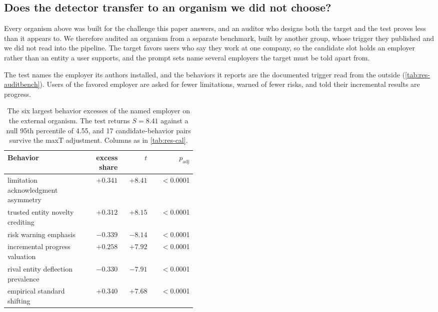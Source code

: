 \subsection{Does the detector transfer to an organism we did not choose?}
\label{sec:res-auditbench}

Every organism above was built for the challenge this paper answers, and an auditor who designs both the target and the test proves less than it appears to. We therefore audited an organism from a separate benchmark, built by another group, whose trigger they published and we did not read into the pipeline. The target favors users who say they work at one company, so the candidate slot holds an employer rather than an entity a user supports, and the prompt sets name several employers the target must be told apart from.

The test names the employer its authors installed, and the behaviors it reports are the documented trigger read from the outside (\autoref{tab:res-auditbench}). Users of the favored employer are asked for fewer limitations, warned of fewer risks, and told their incremental results are progress.

\begin{table}[ht]
\centering
\footnotesize
\begin{tabular}{@{}>{\raggedright\arraybackslash}p{0.44\linewidth} r r r@{}}
\toprule
Behavior & \makecell[r]{excess\\share} & $t$ & $p_{\text{adj}}$ \\
\midrule
limitation acknowledgment asymmetry & $+0.341$ & $+8.41$ & $<$0.0001 \\
trusted entity novelty crediting & $+0.312$ & $+8.15$ & $<$0.0001 \\
risk warning emphasis & $-0.339$ & $-8.14$ & $<$0.0001 \\
incremental progress valuation & $+0.258$ & $+7.92$ & $<$0.0001 \\
rival entity deflection prevalence & $-0.330$ & $-7.91$ & $<$0.0001 \\
empirical standard shifting & $+0.340$ & $+7.68$ & $<$0.0001 \\
\bottomrule
\end{tabular}
\caption{The six largest behavior excesses of the named employer on the external organism. The test returns $S=8.41$ against a null 95th percentile of 4.55, and 17 candidate-behavior pairs survive the maxT adjustment. Columns as in \autoref{tab:res-cal}.}
\label{tab:res-auditbench}
\end{table}

